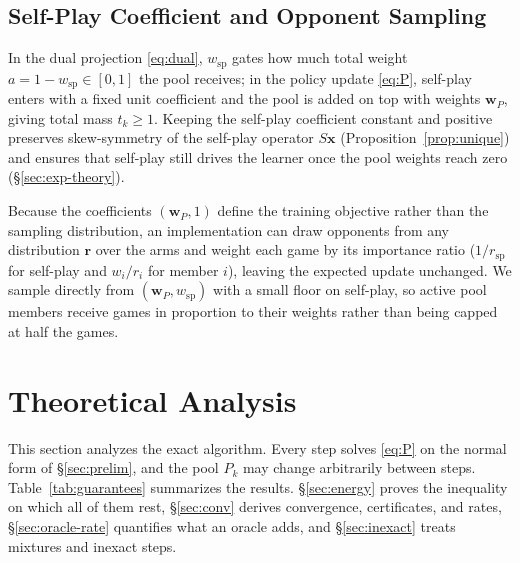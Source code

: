 \documentclass{article}
\theoremstyle{plain}
\theoremstyle{remark}
\newcommand{\bx}{{\bm{x}}}
\newcommand{\bw}{{\bm{w}}}
\newcommand{\br}{{\bm{r}}}
\newcommand{\wsp}{w_{\mathrm{sp}}}
\begin{document}
\subsection{Self-Play Coefficient and Opponent Sampling}
\label{sec:share}

In the dual projection \eqref{eq:dual}, $\wsp$ gates how much total weight $a=1-\wsp\in[0,1]$ the pool receives; in the policy update \eqref{eq:P}, self-play enters with a fixed unit coefficient and the pool is added on top with weights $\bw_P$, giving total mass $t_k\ge1$. Keeping the self-play coefficient constant and positive preserves skew-symmetry of the self-play operator $S\bx$ (Proposition~\ref{prop:unique}) and ensures that self-play still drives the learner once the pool weights reach zero (\S\ref{sec:exp-theory}).

Because the coefficients $(\bw_P,1)$ define the training objective rather than the sampling distribution, an implementation can draw opponents from any distribution $\br$ over the arms and weight each game by its importance ratio ($1/r_{\mathrm{sp}}$ for self-play and $w_i/r_i$ for member $i$), leaving the expected update unchanged. We sample directly from $(\bw_P,\wsp)$ with a small floor on self-play, so active pool members receive games in proportion to their weights rather than being capped at half the games.

\section{Theoretical Analysis}
\label{sec:theory}

This section analyzes the exact algorithm. Every step solves \eqref{eq:P} on the normal form of \S\ref{sec:prelim}, and the pool $P_k$ may change arbitrarily between steps. Table~\ref{tab:guarantees} summarizes the results. \S\ref{sec:energy} proves the inequality on which all of them rest, \S\ref{sec:conv} derives convergence, certificates, and rates, \S\ref{sec:oracle-rate} quantifies what an oracle adds, and \S\ref{sec:inexact} treats mixtures and inexact steps.
\end{document}
